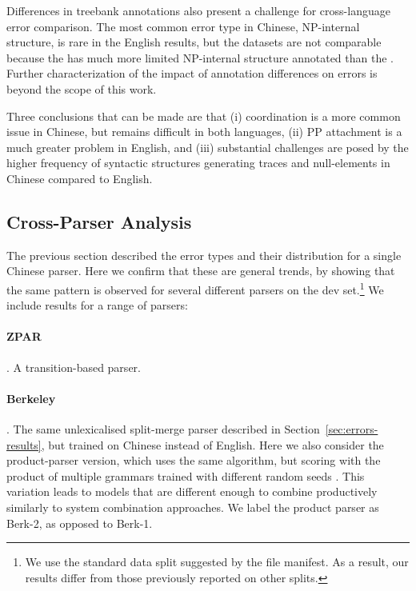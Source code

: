 Differences in treebank annotations also present a challenge for cross-language error comparison.
The most common error type in Chinese, NP-internal structure, is rare in the English results, but the datasets are not comparable because the \ptb has much more limited NP-internal structure annotated than the \pctb.
Further characterization of the impact of annotation differences on errors is beyond the scope of this work.

Three conclusions that can be made are that (i) coordination is a more common issue in Chinese, but remains difficult in
both languages, (ii) PP attachment is a much greater problem in English, and
(iii) substantial challenges are posed by the higher frequency of
syntactic structures generating traces and null-elements in Chinese compared to English.

\subsection{Cross-Parser Analysis} \label{sec:cross_parser_analysis}

The previous section described the error types and their distribution for a single Chinese parser.
Here we confirm that these are general trends, by showing that the same pattern
is observed for several different parsers on the  dev set.\footnote{
  We use the standard data split suggested by the  file manifest.
  As a result, our results differ from those previously reported on other splits.
}
We include results for a range of parsers:

\paragraph{ZPAR} \parencite{Zhang-Clark:2009:ICPT}.
A transition-based parser.

\paragraph{Berkeley} \parencite{Petrov-etal:2006,Petrov-Klein:2007}.
The same unlexicalised split-merge parser described in Section~\ref{sec:errors-results}, but trained on Chinese instead of English.
Here we also consider the product-parser version, which uses the same algorithm, but scoring with the product of multiple grammars trained with different random seeds \parencite{Petrov:2010:NAACLHLT}.
This variation leads to models that are different enough to combine productively similarly to system combination approaches.
We label the product parser as Berk-2, as opposed to Berk-1.

